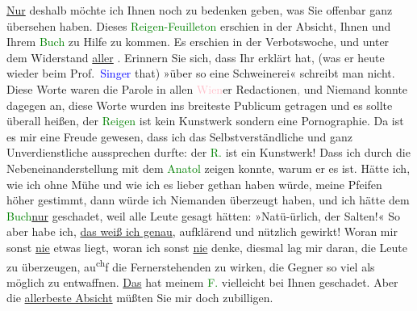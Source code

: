 \pstart
           \uline{Nur} deshalb möchte ich Ihnen noch zu bedenken geben,
               was Sie offenbar ganz übersehen haben. Dieses \textcolor{green}{Reigen-Feuilleton}{}\ledrightnote{{$\rightarrow$}\textcolor{green}{Arthur Schnitzler und sein »Reigen«}} erschien in der Absicht, Ihnen und Ihrem
                  \textcolor{green}{Buch}{}\ledrightnote{{$\rightarrow$}\textcolor{green}{Reigen. Zehn Dialoge}} zu Hilfe zu kommen. Es
               erschien in der Verbotswoche, und unter dem Widerstand \uline{aller}{ }\label{K_L03353-7v}\label{K_L03353-7h}. Erinnern Sie sich, dass Ihr \label{K_L03353-8v}\label{K_L03353-8h} erklärt hat, (was er heute wieder beim
                  Prof. \textcolor{blue}{Singer}{}\ledrightnote{\textcolor{blue}{Isidor Singer}} that) »über so eine
               Schweinerei« schreibt man nicht. Diese Worte waren die Parole in allen \textcolor{pink}{Wien}{}\ledrightnote{\textcolor{pink}{Wien}}er Redactionen\textcolor{gray}{,} und Niemand
               konnte dagegen an, diese Worte wurden ins breiteste Publicum getragen und es sollte
               überall heißen, der \textcolor{green}{Reigen}{}\ledrightnote{\textcolor{green}{Reigen. Zehn Dialoge}} ist kein Kunstwerk
               sondern eine Pornographie. Da ist es mir eine Freude gewesen, dass ich das
               Selbstverständliche und ganz Unverdienstliche aussprechen durfte: der \textcolor{green}{R.}{}\ledrightnote{\textcolor{green}{Reigen. Zehn Dialoge}} ist ein Kunstwerk! Dass ich durch die
               Nebeneinanderstellung mit dem \textcolor{green}{Anatol}{}\ledrightnote{\textcolor{green}{Anatol}} zeigen
               konnte, warum er es ist. Hätte ich, wie ich ohne Mühe und wie ich es lieber gethan
               haben würde, meine Pfeifen höher gestimmt, dann würde ich Niemanden überzeugt haben,
               und ich hätte dem \textcolor{green}{Buch}{}\ledrightnote{{$\rightarrow$}\textcolor{green}{Reigen. Zehn Dialoge}}{ }\uline{nur} geschadet, weil alle Leute gesagt hätten:
               »Natü-ürlich, der Salten!« So aber habe ich, \uline{das weiß ich
                  genau}, aufklärend und nützlich gewirkt! Woran mir sonst \uline{nie} etwas liegt, woran ich sonst \uline{nie}
               denke, diesmal lag mir daran, die Leute zu überzeugen, au\substVorne{}\textsuperscript{ch}\substDazwischen{}f\substHinten{} die Fernerstehenden zu wirken, die Gegner so viel als möglich zu entwaffnen.
                  \uline{Das} hat meinem \textcolor{green}{F.}{}\ledrightnote{{$\rightarrow$}\textcolor{green}{Arthur Schnitzler und sein »Reigen«}} vielleicht bei Ihnen geschadet. Aber die \uline{allerbeste Absicht} müßten Sie mir doch zubilligen.\pend
           

